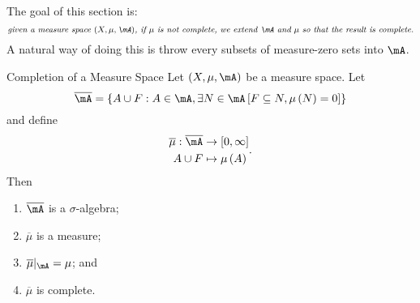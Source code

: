 \documentclass[pmath451]{subfiles}
\begin{document}
    \np The goal of this section is:
    \begin{equation*}
        \text{\textit{given a measure space $\left( X,\mu,\mA \right)$, if $\mu$ is not complete, we extend $\mA$ and $\mu$ so that the result is complete.}}
    \end{equation*}
    A natural way of doing this is throw every subsets of measure-zero sets into $\mA$.

    \begin{prop}{Completion of a Measure Space}
        Let $\left( X,\mu,\mA \right)$ be a measure space. Let
        \begin{equation*}
            \overline{\mA} = \left\lbrace A\cup F: A\in\mA, \exists N\in\mA \left[ F\subseteq N, \mu\left( N \right)=0 \right] \right\rbrace
        \end{equation*}
        and define
        \begin{equation*}
            \begin{aligned}
                \overline{\mu}:\overline{\mA}&\to\left[ 0,\infty \right] \\
                A\cup F &\mapsto\mu\left( A \right)
            \end{aligned} .
        \end{equation*}
        Then 
        \begin{enumerate}
            \item $\overline{\mA}$ is a $\sigma$-algebra;
            \item $\overline{\mu}$ is a measure;
            \item $\overline{\mu}|_{\mA} = \mu$; and
            \item $\overline{\mu}$ is complete.
        \end{enumerate}
    \end{prop}
\end{document}

